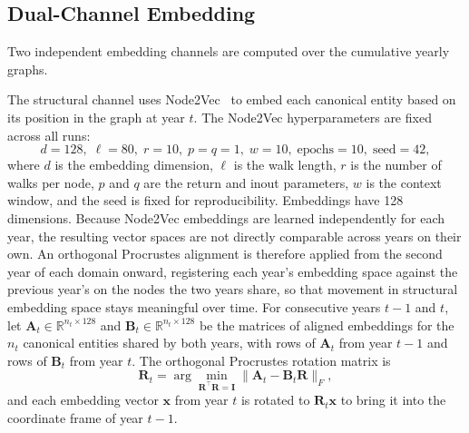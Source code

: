 \documentclass{ieeeaccess}
\begin{document}
\subsection{Dual-Channel Embedding}
\label{sec:embedding}

Two independent embedding channels are computed over the cumulative yearly graphs.

The structural channel uses Node2Vec~\cite{grover2016node2vec} to embed each canonical entity based on its position in the graph at year $t$. The Node2Vec hyperparameters are fixed across all runs:
\begin{equation}
d = 128,\;\ell = 80,\;r = 10,\;p = q = 1,\;w = 10,\;\text{epochs} = 10,\;\text{seed} = 42,
\label{eq:node2vec_params}
\end{equation}
where $d$ is the embedding dimension, $\ell$ is the walk length, $r$ is the number of walks per node, $p$ and $q$ are the return and inout parameters, $w$ is the context window, and the seed is fixed for reproducibility. Embeddings have 128 dimensions. Because Node2Vec embeddings are learned independently for each year, the resulting vector spaces are not directly comparable across years on their own. An orthogonal Procrustes alignment is therefore applied from the second year of each domain onward, registering each year's embedding space against the previous year's on the nodes the two years share, so that movement in structural embedding space stays meaningful over time. For consecutive years $t-1$ and $t$, let $\mathbf{A}_t \in \mathbb{R}^{n_t \times 128}$ and $\mathbf{B}_t \in \mathbb{R}^{n_t \times 128}$ be the matrices of aligned embeddings for the $n_t$ canonical entities shared by both years, with rows of $\mathbf{A}_t$ from year $t-1$ and rows of $\mathbf{B}_t$ from year $t$. The orthogonal Procrustes rotation matrix is
\begin{equation}
\mathbf{R}_t = \arg\min_{\mathbf{R}^{\top}\mathbf{R} = \mathbf{I}} \|\mathbf{A}_t - \mathbf{B}_t\mathbf{R}\|_F,
\label{eq:procrustes}
\end{equation}
and each embedding vector $\mathbf{x}$ from year $t$ is rotated to $\mathbf{R}_t\mathbf{x}$ to bring it into the coordinate frame of year $t-1$.
\end{document}
